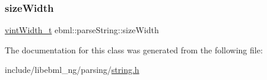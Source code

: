 \mbox{\label{classebml_1_1parseString_ab7d3455fc611ac13f43b99c340a09abc}} 
\subsubsection{\texorpdfstring{size\+Width}{sizeWidth}}
{\footnotesize\ttfamily \mbox{\hyperlink{namespaceebml_a2ccdfb60b23efb51fe07f9d066e23604}{vint\+Width\+\_\+t}} ebml\+::parse\+String\+::size\+Width}



The documentation for this class was generated from the following file\+:\begin{DoxyCompactItemize}
\item 
include/libebml\+\_\+ng/parsing/\mbox{\hyperlink{string_8h}{string.\+h}}\end{DoxyCompactItemize}
